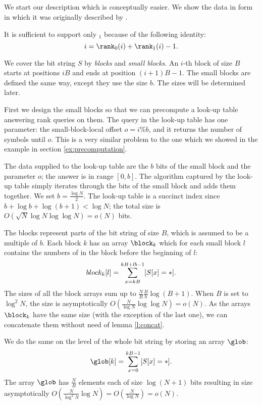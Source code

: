 \subsection{\rank}\label{ss:rank}

We start our description \rank{} which is conceptually easier.
We show the data in form in which it was originally described by \cite{jacobson1988succinct}.

It is sufficient to support only \rank$_1$ because of the following identity:
$$ i = \rank_0(i) + \rank_1(i) - 1. $$

\bigbreak

We cover the bit string $S$ by \emph{blocks} and \emph{small blocks}.
An $i$-th block of size $B$ starts at positions $i B$ and ends at position $(i + 1) B - 1$.
The small blocks are defined the same way, except they use the size $b$.
The sizes will be determined later.

First we design the small blocks so that we can precompute a look-up table \rank{} answering rank queries on them.
The query in the look-up table has one parameter: the small-block-local offset $o = i \% b$, and it returns the number of symbols \ph{} until $o$.
This is a very similar problem to the one which we showed in the example in section \ref{ex:precomputation}.

The data supplied to the look-up table are the $b$ bits of the small block and the parameter $o$; the answer is in range $[0, b]$.
The algorithm captured by the look-up table simply iterates through the bits of the small block and adds them together.
We set $b = \frac{\log N}{2}$.
The look-up table is a succinct index since $b + \log b + \log (b + 1) < \log N$; the total size is $O(\sqrt{N} \log N \log \log N) = o(N)$ bits.

The blocks represent parts of the bit string of size $B$, which is assumed to be a multiple of $b$.
Each block $k$ has an array $\block_k$ which for each small block $l$ contains the numbers of \ph{} in the block before the beginning of $l$:
$$ block_k[l] = \sum_{x = k B}^{k B + l b - 1} [S[x] = \ph]. $$
The sizes of all the block arrays sum up to $\frac{N}{B} \frac{B}{b} \log (B + 1)$.
When $B$ is set to $\log^2 N$, the size is asymptotically $O\left(\frac{N}{\log N} \log \log N\right) = o(N)$.
As the arrays $\block_k$ have the same size (with the exception of the last one), we can concatenate them without need of lemma \ref{l:concat}.

We do the same on the level of the whole bit string by storing an array $\glob$:
$$ \glob[k] = \sum_{x = 0}^{k B - 1} [S[x] = \ph]. $$
The array $\glob$ has $\frac{N}{B}$ elements each of size $\log (N+1)$ bits resulting in size asymptotically $O\left(\frac{N}{\log^2 N} \log{N}\right) = O\left(\frac{N}{\log N}\right) = o(N)$.

